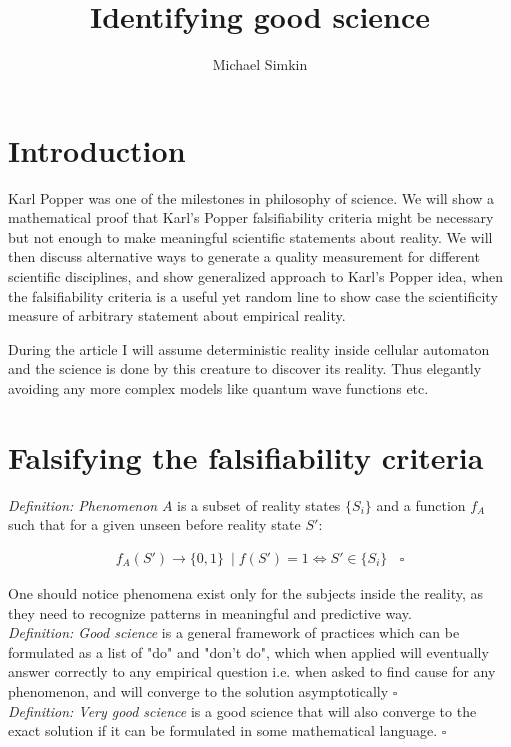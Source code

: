 \documentclass{article}
\title{\Huge Identifying good science}
\author{Michael Simkin}
\begin{document}
	\maketitle
	\section{Introduction}

Karl Popper was one of the milestones in philosophy of science. We will show a mathematical proof that Karl's Popper falsifiability criteria might be necessary but not enough to make meaningful scientific statements about reality. We will then discuss alternative ways to generate a quality measurement for different scientific disciplines, and show generalized approach to Karl's Popper idea, when the falsifiability criteria is a useful yet random line to show case the scientificity measure of arbitrary statement about empirical reality. 

During the article I will assume deterministic reality inside cellular automaton and the science is done by this creature to discover its reality. Thus elegantly avoiding any more complex models like quantum wave functions etc. 

	\section{Falsifying the falsifiability criteria}
	
	\textit{Definition: Phenomenon} $A$ is a subset of reality states $\{S_{i}\}$ and a function $f_{A}$ such that for a given unseen before reality state $S'$:
	
	\begin{align*}	
	f_{A}(S') \to \{0,1\} \ \mid f(S') = 1 \iff S' \in \{S_{i}\} \ \ \ \ 	\square
	\end{align*}

	
	One should notice phenomena exist only for the subjects inside the reality, as they need to recognize patterns in meaningful and predictive way. \\
	
	\textit{Definition: Good science} is a general framework of practices which can be formulated as a list of "do" and "don't do", which when applied will eventually answer correctly to any empirical question i.e. when asked to find cause for any phenomenon, and will converge to the solution asymptotically $\square$\\

	\textit{Definition: Very good science} is a good science that will also converge to the exact solution if it can be formulated in some mathematical language. $\square$\\
	
\end{document}

